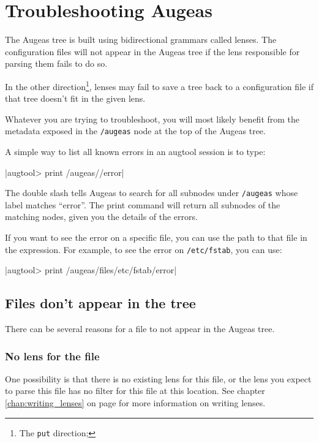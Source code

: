 \chapter{Troubleshooting Augeas}

\label{chap:troubleshooting} 

The Augeas tree is built using bidirectional grammars called lenses. The configuration files will not appear in the Augeas tree if the lens responsible for parsing them fails to do so.

In the other direction\footnote{The \verb!put! direction; }, lenses may fail to save a tree back to a configuration file if that tree doesn't fit in the given lens.

Whatever you are trying to troubleshoot, you will most likely benefit from the metadata exposed in the \nolinkurl{/augeas} node at the top of the Augeas tree.

A simple way to list all known errors in an augtool session is to type:

 

\augtoolshcode|augtool> print /augeas//error|

The double slash tells Augeas to search for all subnodes under \nolinkurl{/augeas} whose label matches ``error''. The print command will return all subnodes of the matching nodes, given you the details of the errors.

If you want to see the error on a specific file, you can use the path to that file in the expression. For example, to see the error on \nolinkurl{/etc/fstab}, you can use:

 

\augtoolshcode|augtool> print /augeas/files/etc/fstab/error|

\section{Files don't appear in the tree}

There can be several reasons for a file to not appear in the Augeas tree.

\subsection{No lens for the file}

One possibility is that there is no existing lens for this file, or the lens you expect to parse this file has no filter for this file at this location. See chapter \ref{chap:writing_lenses} on page \pageref{chap:writing_lenses} for more information on writing lenses.

